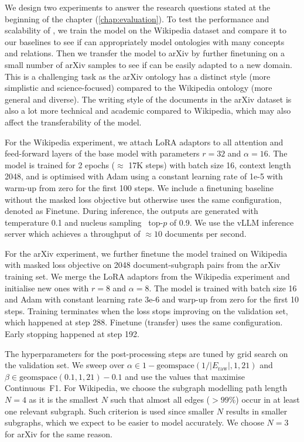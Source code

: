 We design two experiments to answer the research questions stated at the beginning of the chapter (\cref{chap:evaluation}). To test the performance and scalability of \name, we train the model on the Wikipedia dataset and compare it to our baselines to see if \name can appropriately model ontologies with many concepts and relations. Then we transfer the model to arXiv by further finetuning on a small number of arXiv samples to see if \name can be easily adapted to a new domain. This is a challenging task as the arXiv ontology has a distinct style (more simplistic and science-focused) compared to the Wikipedia ontology (more general and diverse). The writing style of the documents in the arXiv dataset is also a lot more technical and academic compared to Wikipedia, which may also affect the transferability of the model.

For the Wikipedia experiment, we attach LoRA adaptors to all attention and feed-forward layers of the base model with parameters $r=32$ and $\alpha=16$. The model is trained for 2 epochs ($\approx$ 17K steps) with batch size 16, context length 2048, and is optimised with Adam using a constant learning rate of 1e-5 with warm-up from zero for the first 100 steps. We include a finetuning baseline without the masked loss objective but otherwise uses the same configuration, denoted as Finetune. During inference, the outputs are generated with temperature 0.1 and nucleus sampling~\cite{holtzman2019curious} top-$p$ of 0.9. We use the vLLM \cite{kwon2023efficient} inference server which achieves a throughput of $\approx 10$ documents per second.

For the arXiv experiment, we further finetune the model trained on Wikipedia with masked loss objective on 2048 document-subgraph pairs from the arXiv training set. We merge the LoRA adaptors from the Wikipedia experiment and initialise new ones with $r=8$ and $\alpha=8$. The model is trained with batch size 16 and Adam with constant learning rate 3e-6 and warp-up from zero for the first 10 steps. Training terminates when the loss stops improving on the validation set, which happened at step 288. Finetune (transfer) uses the same configuration. Early stopping happened at step 192.

The hyperparameters for the post-processing steps are tuned by grid search on the validation set. We sweep over $\alpha \in 1 - \text{geomspace}(1 / |E_\text{raw}|, 1, 21)$ and $\beta \in \text{geomspace}(0.1, 1, 21) - 0.1$ and use the values that maximise Continuous~F1. For Wikipedia, we choose the subgraph modelling path length $N=4$ as it is the smallest $N$ such that almost all edges ($>99\%$) occur in at least one relevant subgraph. Such criterion is used since smaller $N$ results in smaller subgraphs, which we expect to be easier to model accurately. We choose $N=3$ for arXiv for the same reason.

